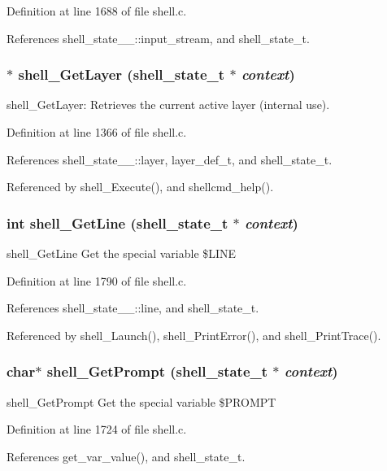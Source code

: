 Definition at line 1688 of file shell.c.

References shell\_\-state\_\-\_\-::input\_\-stream, and shell\_\-state\_\-t.
\subsubsection{$\ast$ shell\_\-Get\-Layer ({\bf shell\_\-state\_\-t} $\ast$ {\em context})}\label{shell_8h_a18}


shell\_\-Get\-Layer: Retrieves the current active layer (internal use). 

Definition at line 1366 of file shell.c.

References shell\_\-state\_\-\_\-::layer, layer\_\-def\_\-t, and shell\_\-state\_\-t.

Referenced by shell\_\-Execute(), and shellcmd\_\-help().
\subsubsection{\setlength{\rightskip}{0pt plus 5cm}int shell\_\-Get\-Line ({\bf shell\_\-state\_\-t} $\ast$ {\em context})}\label{shell_8h_a31}


shell\_\-Get\-Line Get the special variable \$LINE 

Definition at line 1790 of file shell.c.

References shell\_\-state\_\-\_\-::line, and shell\_\-state\_\-t.

Referenced by shell\_\-Launch(), shell\_\-Print\-Error(), and shell\_\-Print\-Trace().
\subsubsection{\setlength{\rightskip}{0pt plus 5cm}char$\ast$ shell\_\-Get\-Prompt ({\bf shell\_\-state\_\-t} $\ast$ {\em context})}\label{shell_8h_a28}


shell\_\-Get\-Prompt Get the special variable \$PROMPT 

Definition at line 1724 of file shell.c.

References get\_\-var\_\-value(), and shell\_\-state\_\-t.
